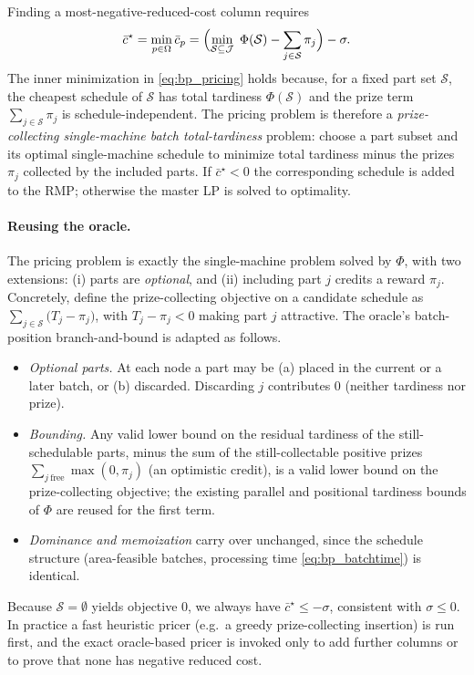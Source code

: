 \documentclass[review,3p,times,authoryear]{elsarticle}
\newcommand{\J}{\mathcal{J}}
\newcommand{\Om}{\Omega}
\begin{document}
Finding a most-negative-reduced-cost column requires
\begin{equation}
\bar c^\star=\min_{p\in\Om}\bar c_p
=\Bigl(\min_{\mathcal{S}\subseteq\J}\;\Phi(\mathcal{S})-\sum_{j\in\mathcal{S}}\pi_j\Bigr)-\sigma .
\label{eq:bp_pricing}
\end{equation}
The inner minimization in \eqref{eq:bp_pricing} holds because, for a fixed part
set $\mathcal{S}$, the cheapest schedule of $\mathcal{S}$ has total tardiness
$\Phi(\mathcal{S})$ and the prize term $\sum_{j\in\mathcal{S}}\pi_j$ is
schedule-independent. The pricing problem is therefore a
\emph{prize-collecting single-machine batch total-tardiness} problem: choose a
part subset and its optimal single-machine schedule to minimize total tardiness
minus the prizes $\pi_j$ collected by the included parts. If $\bar c^\star<0$ the
corresponding schedule is added to the RMP; otherwise the master LP is solved to
optimality.

\paragraph{Reusing the oracle.} The pricing problem is exactly the single-machine
problem solved by $\Phi$, with two extensions: (i) parts are \emph{optional}, and
(ii) including part $j$ credits a reward $\pi_j$. Concretely, define the
prize-collecting objective on a candidate schedule as
$\sum_{j\in\mathcal{S}}\bigl(T_j-\pi_j\bigr)$, with $T_j-\pi_j<0$ making part $j$
attractive. The oracle's batch-position branch-and-bound is adapted as follows.
\begin{itemize}
\item \emph{Optional parts.} At each node a part may be (a) placed in the current
or a later batch, or (b) discarded. Discarding $j$ contributes $0$ (neither
tardiness nor prize).
\item \emph{Bounding.} Any valid lower bound on the residual tardiness of the
still-schedulable parts, minus the sum of the still-collectable positive prizes
$\sum_{j\ \text{free}}\max(0,\pi_j)$ (an optimistic credit), is a valid lower
bound on the prize-collecting objective; the existing parallel and positional
tardiness bounds of $\Phi$ are reused for the first term.
\item \emph{Dominance and memoization} carry over unchanged, since the schedule
structure (area-feasible batches, processing time \eqref{eq:bp_batchtime}) is
identical.
\end{itemize}
Because $\mathcal{S}=\emptyset$ yields objective $0$, we always have
$\bar c^\star\le-\sigma$, consistent with $\sigma\le 0$. In practice a fast
heuristic pricer (e.g.\ a greedy prize-collecting insertion) is run first, and
the exact oracle-based pricer is invoked only to add further columns or to prove
that none has negative reduced cost.
\end{document}

